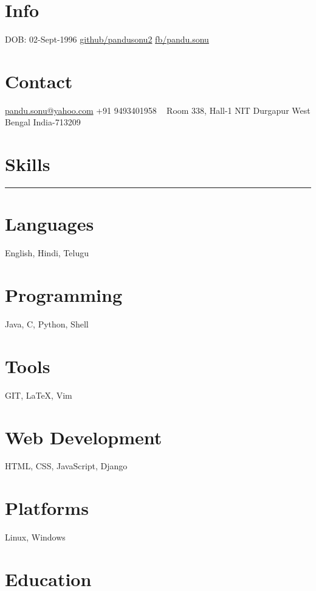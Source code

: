 \documentclass[]{friggeri-cv-a4}
\begin{document}


\begin{aside}
\section{Info}
DOB: 02-Sept-1996
\href{http://github.com/pandusonu2}{github/pandusonu2}
\href{http://www.fb.com/pandu.sonu}{fb/pandu.sonu}

\section{Contact}
\href{mailto:pandu.sonu@yahoo.com}{pandu.sonu@yahoo.com}
+91 9493401958
~
Room 338, Hall-1
NIT Durgapur
West Bengal
India-713209
~
\section{Skills}
\noindent\rule{3cm}{0.5pt}
\section{Languages}
English, Hindi, Telugu
\section{Programming}
Java, C, Python, Shell
\section{Tools}
GIT, \LaTeX, Vim
\section{Web Development}
HTML, CSS, JavaScript, Django
\section{Platforms}
Linux, Windows
\end{aside}


\section{\normalfont Education}
\end{document}
